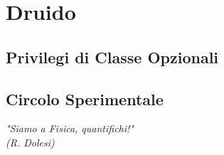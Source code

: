 \chapter{Druido}

\section{Privilegi di Classe Opzionali}

\section{Circolo Sperimentale}

\begin{DndReadAloud}
  \it
  "Siamo a Fisica, quantifichi!" \\ (R. Dolesi)
\end{DndReadAloud}

